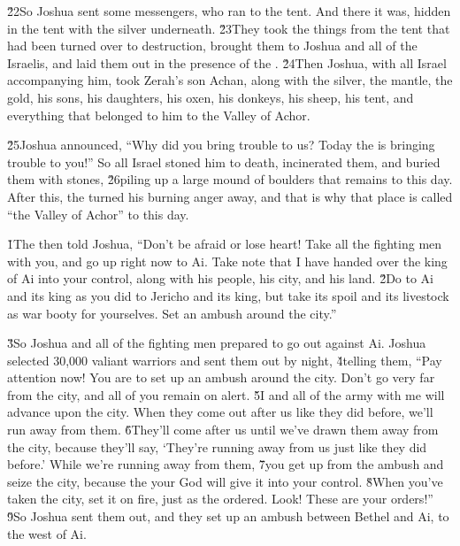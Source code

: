 \v{22}So Joshua sent some messengers, who ran to the tent. And there it was, hidden in the tent with the silver underneath. \v{23}They took the things from the tent that had been turned over to destruction, brought them to Joshua and all of the Israelis, and laid them out in the presence of the . \v{24}Then Joshua, with all Israel accompanying him, took Zerah's son Achan, along with the silver, the mantle, the gold, his sons, his daughters, his oxen, his donkeys, his sheep, his tent, and everything that belonged to him to the Valley of Achor.

\v{25}Joshua announced, ``Why did you bring trouble to us? Today the  is bringing trouble to you!'' So all Israel stoned him to death, incinerated them, and buried them with stones, \v{26}piling up a large mound of boulders that remains to this day. After this, the  turned his burning anger away, and that is why that place is called ``the Valley of Achor'' to this day.

\v{1}The  then told Joshua, ``Don't be afraid or lose heart! Take all the fighting men with you, and go up right now to Ai. Take note that I have handed over the king of Ai into your control, along with his people, his city, and his land. \v{2}Do to Ai and its king as you did to Jericho and its king, but take its spoil and its livestock as war booty for yourselves. Set an ambush around the city.''

\v{3}So Joshua and all of the fighting men prepared to go out against Ai. Joshua selected 30,000 valiant warriors and sent them out by night, \v{4}telling them, ``Pay attention now! You are to set up an ambush around the city. Don't go very far from the city, and all of you remain on alert. \v{5}I and all of the army with me will advance upon the city. When they come out after us like they did before, we'll run away from them. \v{6}They'll come after us until we've drawn them away from the city, because they'll say, `They're running away from us just like they did before.' While we're running away from them, \v{7}you get up from the ambush and seize the city, because the  your God will give it into your control. \v{8}When you've taken the city, set it on fire, just as the  ordered. Look! These are your orders!'' \v{9}So Joshua sent them out, and they set up an ambush between Bethel and Ai, to the west of Ai.

